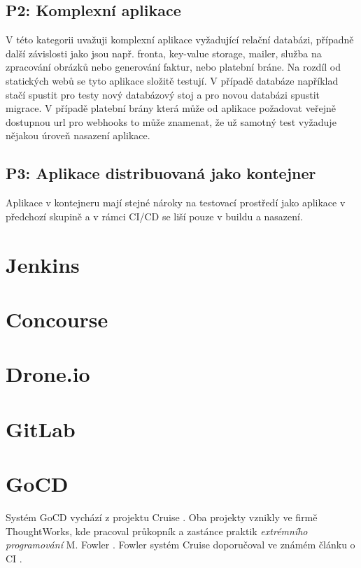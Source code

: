         \subsection{P2: Komplexní aplikace}
            V této kategorii uvažuji komplexní aplikace vyžadující relační databázi, případně další závislosti jako jsou např. fronta, key-value storage, mailer, služba na zpracování obrázků nebo generování faktur, nebo platební bráne. Na rozdíl od statických webů se tyto aplikace složitě testují. V případě databáze například stačí spustit pro testy nový databázový stoj a pro novou databázi spustit migrace. V případě platební brány která může od aplikace požadovat veřejně dostupnou url pro webhooks to může znamenat, že už samotný test vyžaduje nějakou úroveň nasazení aplikace. 

            \blind[1]


        \subsection{P3: Aplikace distribuovaná jako kontejner}
            Aplikace v kontejneru mají stejné nároky na testovací prostředí jako aplikace v předchozí skupině a v rámci CI/CD se liší pouze v buildu a nasazení.

            \blind[1]

    \section{Jenkins}
    \section{Concourse}
    \section{Drone.io}
    \section{GitLab}

    \section{GoCD}
        Systém GoCD vychází z projektu Cruise \cite{thoughtworks-gocd}. Oba projekty vznikly ve firmě ThoughtWorks, kde pracoval průkopník a zastánce praktik \textit{extrémního programování} M. Fowler \cite{fowler-go}. Fowler systém Cruise doporučoval ve známém článku o CI \cite{fowler-ci}.

